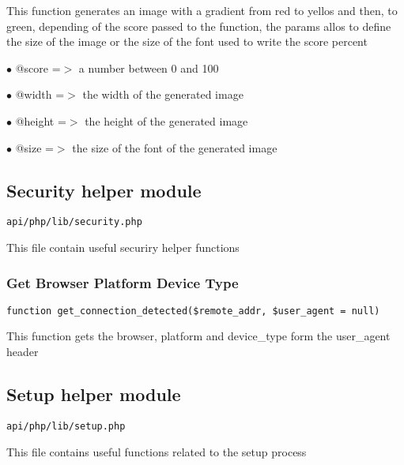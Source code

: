 \documentclass[a4paper]{article}
\begin{document}
This function generates an image with a gradient from red to yellos and
then, to green, depending of the score passed to the function, the params
allos to define the size of the image or the size of the font used to
write the score percent

\begin{compactitem}
\item[\color{myblue}$\bullet$] @score  =$>$ a number between 0 and 100
\item[\color{myblue}$\bullet$] @width  =$>$ the width of the generated image
\item[\color{myblue}$\bullet$] @height =$>$ the height of the generated image
\item[\color{myblue}$\bullet$] @size   =$>$ the size of the font of the generated image
\end{compactitem}

\hypertarget{toc527}{}
\subsection{Security helper module}

\begin{lstlisting}
api/php/lib/security.php
\end{lstlisting}

This file contain useful securiry helper functions

\hypertarget{toc528}{}
\subsubsection{Get Browser Platform Device Type}

\begin{lstlisting}
function get_connection_detected($remote_addr, $user_agent = null)
\end{lstlisting}

This function gets the browser, platform and device\_type form the user\_agent header

\hypertarget{toc529}{}
\subsection{Setup helper module}

\begin{lstlisting}
api/php/lib/setup.php
\end{lstlisting}

This file contains useful functions related to the setup process
\end{document}

